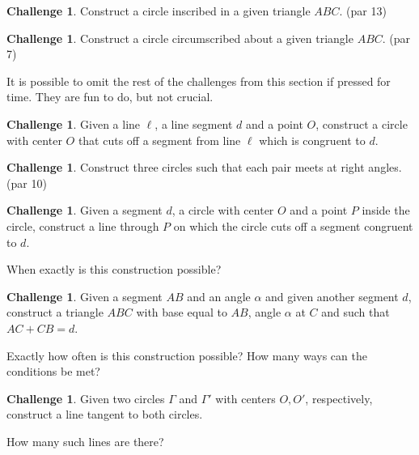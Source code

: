 \documentclass{tufte-handout}
\theoremstyle{definition}
\newtheorem{challenge}[problem]{Challenge}
\begin{document}
\begin{challenge}\label{chal:triangle-inscribe-circle}
Construct a circle inscribed in a given triangle $ABC$. (par 13)
\end{challenge}

\begin{challenge}\label{chal:triangle-circumscribe-circle}
Construct a circle circumscribed about a given triangle $ABC$. (par 7)
\end{challenge}

It is possible to omit the rest of the challenges from this section if pressed for time. They are fun to do, but not crucial.

\begin{challenge}\label{chal:cut-segment-by-circle}
Given a line $\ell$, a line segment $d$ and a point $O$, construct a circle with center $O$ that cuts off a segment from line $\ell$ which is congruent to $d$.
\end{challenge}



\begin{challenge}\label{chal:three-perp-circles}
Construct three circles such that each pair meets at right angles. (par 10)
\end{challenge}

\begin{challenge}\label{chal:cut-circle-by-segment}
Given a segment $d$, a circle with center $O$ and a point $P$ inside the circle, construct a line through $P$ on which the circle cuts off a segment congruent to $d$.

When exactly is this construction possible?
\end{challenge}


\begin{challenge}\label{chal:triangle-problem}
Given a segment $AB$ and an angle $\alpha$ and given another segment $d$, construct a triangle $ABC$ with base equal to $AB$, angle $\alpha$ at $C$ and such that $AC + CB = d$.

Exactly how often is this construction possible? How many ways can the conditions be met?
\end{challenge}


\begin{challenge}\label{chal:double-tangent}
Given two circles $\Gamma$ and $\Gamma'$ with centers $O, O'$, respectively, construct a line tangent to both circles.

How many such lines are there?
\end{challenge}
\end{document}
